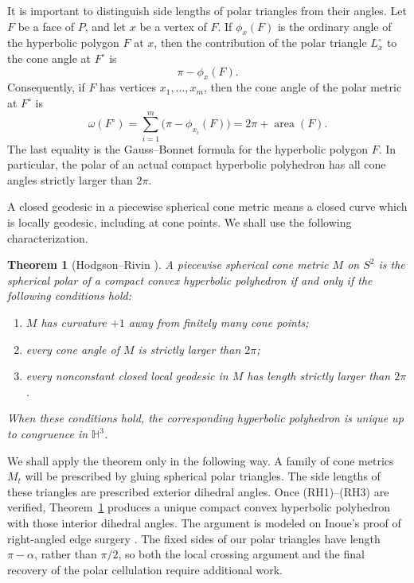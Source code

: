 \documentclass[12pt,a4paper]{article}
\newtheorem{theorem}{Theorem}[section]
\theoremstyle{definition}
\DeclareMathOperator{\Area}{area}
\newcommand{\HH}{\mathbb H}
\begin{document}
It is important to distinguish side lengths of polar triangles from their angles.
Let \(F\) be a face of \(P\), and let \(x\) be a vertex of \(F\).  If
\(\phi_x(F)\) is the ordinary angle of the hyperbolic polygon \(F\) at \(x\), then
the contribution of the polar triangle \(L_x^\circ\) to the cone angle at
\(F^\circ\) is
\[
        \pi-\phi_x(F).
\]
Consequently, if \(F\) has vertices \(x_1,\ldots,x_m\), then the cone angle of the
polar metric at \(F^\circ\) is
\begin{equation}\label{eq:polar-cone-angle-face}
        \omega(F^\circ)
        =\sum_{i=1}^m\bigl(\pi-\phi_{x_i}(F)\bigr)
        =2\pi+\Area(F).
\end{equation}
The last equality is the Gauss--Bonnet formula for the hyperbolic polygon \(F\).
In particular, the polar of an actual compact hyperbolic polyhedron has all cone
angles strictly larger than \(2\pi\).

A closed geodesic in a piecewise spherical cone metric means a closed curve which
is locally geodesic, including at cone points.  We shall use the following
characterization.

\begin{theorem}[{Hodgson--Rivin \cite[Theorem~1.1]{RivinHodgson1993}}]\label{thm:rhs}
A piecewise spherical cone metric \(M\) on \(S^2\) is the spherical polar of a
compact convex hyperbolic polyhedron if and only if the following conditions hold:
\begin{enumerate}[label=\textup{(RH\arabic*)}]
\item \(M\) has curvature \(+1\) away from finitely many cone points;
\item every cone angle of \(M\) is strictly larger than \(2\pi\);
\item every nonconstant closed local geodesic in \(M\) has length strictly
larger than \(2\pi\).
\end{enumerate}
When these conditions hold, the corresponding hyperbolic polyhedron is unique up
to congruence in \(\HH^3\).
\end{theorem}

We shall apply the theorem only in the following way.  A family of cone metrics
\(M_t\) will be prescribed by gluing spherical polar triangles.  The side lengths
of these triangles are prescribed exterior dihedral angles.  Once
\textup{(RH1)}--\textup{(RH3)} are verified, Theorem~\ref{thm:rhs} produces a
unique compact convex hyperbolic polyhedron with those interior dihedral angles.
The argument is modeled on Inoue's proof of right-angled edge surgery
\cite[Section~8]{Inoue2008}.  The fixed sides of our polar triangles have
length \(\pi-\alpha\), rather than \(\pi/2\), so both the local crossing
argument and the final recovery of the polar cellulation require additional
work.
\end{document}
